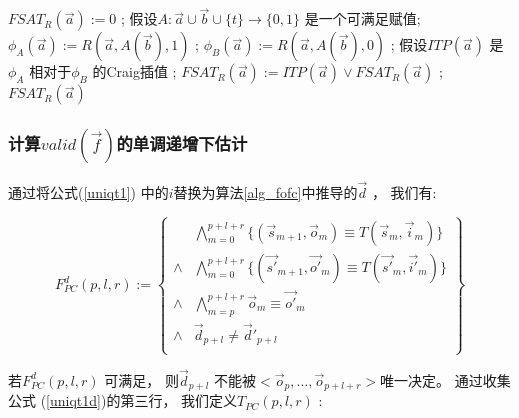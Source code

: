 \begin{algorithm}[t]
\begin{algorithmic}[1]
\label{initcondition}
\STATE $FSAT_R(\vec{a}):= 0$ ;
\label{testsat}
  \STATE 假设$A:\vec{a}\cup\vec{b}\cup\{t\}\rightarrow \{0,1\}$ 是一个可满足赋值;
\label{cofact1}
  \STATE $\phi_A(\vec{a}):= R(\vec{a},A(\vec{b}),1)$ ;
\label{cofact2}
  \STATE $\phi_B(\vec{a}):= R(\vec{a},A(\vec{b}),0)$ ;
\label{ab}
  \STATE 假设$ITP(\vec{a})$ 是$\phi_A$ 相对于$\phi_B$ 的Craig插值 ;
\label{add}
  \STATE $FSAT_R(\vec{a}):= ITP(\vec{a}) \vee FSAT_R(\vec{a})$ ;
\ENDWHILE
\RETURN $FSAT_R(\vec{a})$
\caption{$CharacterizingFormulaSAT(R,\vec{a},\vec{b},t)$}
\label{alg_craigchar}
\end{algorithmic}
\end{algorithm}

\subsubsection{计算$valid(\vec{f})$的单调递增下估计}\label{subsub_nonloop}
通过将公式(\ref{uniqt1}) 中的$i$替换为算法\ref{alg_fofc}中推导的$\vec{d}$ ，
我们有:

\begin{equation}\label{uniqt1d}
F^d_{PC}(p,l,r):=
\left\{
\begin{array}{cc}
&\bigwedge_{m=0}^{p+l+r}
\{
(\vec{s}_{m+1},\vec{o}_m)\equiv T(\vec{s}_m,\vec{i}_m)
\}
\\
\wedge&\bigwedge_{m=0}^{p+l+r}
\{
(\vec{s'}_{m+1},\vec{o'}_m)\equiv T(\vec{s'}_m,\vec{i'}_m)
\}
\\
\wedge&\bigwedge_{m=p}^{p+l+r}\vec{o}_m\equiv \vec{o'}_m \\
\wedge& \vec{d}_{p+l}\ne \vec{d}'_{p+l} \\
\end{array}
\right\}
\end{equation}

若$F^d_{PC}(p,l,r)$ 可满足，
则$\vec{d}_{p+l}$ 不能被$<\vec{o}_p,\dots,\vec{o}_{p+l+r}>$唯一决定。
通过收集公式 (\ref{uniqt1d})的第三行，
我们定义$T_{PC}(p,l,r)$ :


